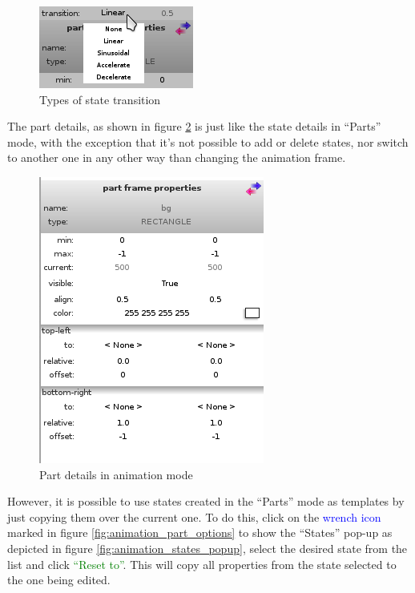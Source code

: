 \documentclass[a4paper]{profusion}
\newcommand{\GUIButton}[1]{\textcolor{green}{#1}} %
\newcommand{\GUIIcon}[1]{\textcolor{blue}{#1}}    %
\begin{document}
\begin{figure}[h!]
  \centering
  \includegraphics{images/animation_transitions.png}
  \caption{Types of state transition}
  \label{fig:animation_transitions}
\end{figure}

  The part details, as shown in figure \ref{fig:animation_part_details} is
  just like the state details in ``Parts'' mode, with the exception that
  it's not possible to add or delete states, nor switch to another one in
  any other way than changing the animation frame.

\begin{figure}[h!]
  \centering
  \includegraphics{images/animation_part_details.png}
  \caption{Part details in animation mode}
  \label{fig:animation_part_details}
\end{figure}

  However, it is possible to use states created in the ``Parts'' mode
  as templates by just copying them over the current one. To do this,
  click on the \GUIIcon{wrench icon} marked in figure
  \ref{fig:animation_part_options} to show the ``States'' pop-up as
  depicted in figure \ref{fig:animation_states_popup}, select the
  desired state from the list and click \GUIButton{``Reset to''}. This
  will copy all properties from the state selected to the one being
  edited.
\end{document}
